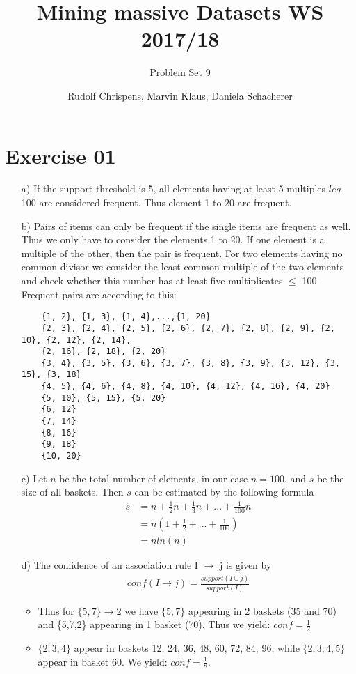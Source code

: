 \documentclass[11pt,a4paper]{scrartcl}
\title{Mining massive Datasets WS 2017/18}
\subtitle{Problem Set 9}
\author{Rudolf Chrispens, Marvin Klaus, Daniela Schacherer}
\begin{document}
\maketitle

\section*{Exercise 01}
\begin{itemize}
	\item[a)] If the support threshold is 5, all elements having at least 5 multiples $leq$ 100 are considered frequent. Thus element 1 to 20 are frequent. 
	\item[b)] Pairs of items can only be frequent if the single items are frequent as well. Thus we only have to consider the elements 1 to 20. If one element is a multiple of the other, then the pair is frequent. For two elements having no common divisor we consider the least common multiple of the two elements and check whether this number has at least five multiplicates $\leq$ 100. Frequent pairs are according to this:
	\begin{verbatim}
	{1, 2}, {1, 3}, {1, 4},...,{1, 20}
	{2, 3}, {2, 4}, {2, 5}, {2, 6}, {2, 7}, {2, 8}, {2, 9}, {2, 10}, {2, 12}, {2, 14}, 
	{2, 16}, {2, 18}, {2, 20}
	{3, 4}, {3, 5}, {3, 6}, {3, 7}, {3, 8}, {3, 9}, {3, 12}, {3, 15}, {3, 18} 
	{4, 5}, {4, 6}, {4, 8}, {4, 10}, {4, 12}, {4, 16}, {4, 20}
	{5, 10}, {5, 15}, {5, 20}
	{6, 12}
	{7, 14}
	{8, 16}
	{9, 18}
	{10, 20} 
	\end{verbatim}
	
	\item[c)] Let $n$ be the total number of elements, in our case $n = 100$, and $s$ be the size of all baskets. Then $s$ can be estimated by the following formula 
	\begin{align*}
		s &= n + \frac{1}{2}n + \frac{1}{3}n + ... + \frac{1}{100}n \\
		&= n (1 + \frac{1}{2}+...+ \frac{1}{100}) \\
		&= n ln(n)
	\end{align*}
	
	\item[d)] The confidence of an association rule I $\rightarrow$ j is given by 
	\begin{align*}
		conf(I \rightarrow j) = \frac{support(I \cup j)}{support(I)}
	\end{align*}
	\begin{itemize}
		\item Thus for $\{5, 7\} \rightarrow 2$ we have $\{5, 7\}$ appearing in 2 baskets (35 and 70) and \{5,7,2\} appearing in 1 basket (70). Thus we yield: $conf = \frac{1}{2}$
		\item $\{2,3,4\}$ appear in baskets 12, 24, 36, 48, 60, 72, 84, 96, while $\{2,3,4,5\}$ appear in basket 60. We yield: $conf = \frac{1}{8}$.
	\end{itemize}
	
\end{itemize}
\end{document}
